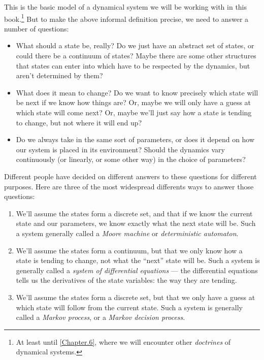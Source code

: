 \documentclass[DynamicalBook]{subfiles}
\begin{document}
This is the basic model of a dynamical system we will be working with in this
book.\footnote{At least until \cref{Chapter.6}, where we will encounter other \emph{doctrines} of dynamical systems.} But to make the above informal definition precise, we need to answer
a number of questions:
\begin{itemize}
  \item What should a state be, really? Do we just have an abstract set of
    states, or could there be a continuum of states? Maybe there are some other
    structures that states can enter into which have to be respected by the
    dynamics, but aren't determined by them? 
  \item What does it mean to change? Do we want to know precisely which state
    will be next if we know how things are? Or, maybe we will only have a guess
    at which state will come next? Or, maybe we'll just say how a state is
    tending to change, but not where it will end up?
  \item Do we always take in the same sort of parameters, or does it depend on
    how our system is placed in its environment? Should the dynamics vary
    continuously (or linearly, or some other way) in the choice of parameters? 
\end{itemize}

Different people have decided on different answers to these questions for
different purposes. Here are three of the most widespread differents ways to answer those
questions:
\begin{enumerate}
  \item We'll assume the states form a discrete set, and that if we know the
    current state and our parameters, we know exactly what the next state will
    be. Such a system generally called a \emph{Moore machine} or \emph{deterministic automaton}.
  \item We'll assume the states form a continuum, but that we only know how a
    state is tending to change, not what the ``next'' state will be. Such a
    system is generally called a \emph{system of
      differential equations} --- the differential equations tells us the
    derivatives of the state variables: the way they are tending.
  \item We'll assume the states form a discrete set, but that we only have a
    guess at which state will follow from the current state. Such a system is generally
    called a \emph{Markov process}, or a \emph{Markov decision process}.
\end{enumerate}
\end{document}
